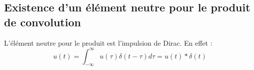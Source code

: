 \subsection{Existence d'un élément neutre pour le produit de convolution}
L'élément neutre pour le produit est l'impulsion de Dirac. En effet :
\begin{equation}
	u(t) = \int_{-\infty}^\infty u(\tau)\delta(t-\tau)d\tau = u(t)*\delta(t)
\end{equation}

































